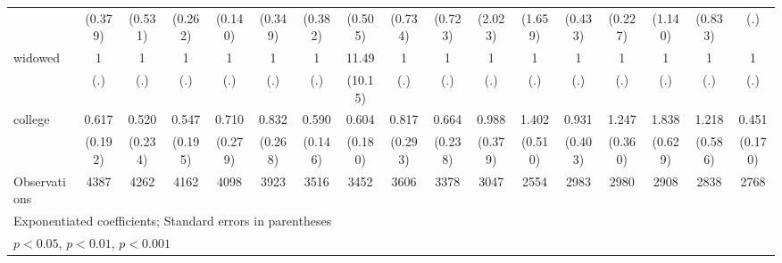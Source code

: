 {\begin{tabular}{l*{16}{c}}
                    &     (0.379)         &     (0.531)         &     (0.262)         &     (0.140)         &     (0.349)         &     (0.382)         &     (0.505)         &     (0.734)         &     (0.723)         &     (2.023)         &     (1.659)         &     (0.433)         &     (0.227)         &     (1.140)         &     (0.833)         &         (.)         \\
[1em]
widowed             &           1         &           1         &           1         &           1         &           1         &           1         &       11.49\sym{**} &           1         &           1         &           1         &           1         &           1         &           1         &           1         &           1         &           1         \\
                    &         (.)         &         (.)         &         (.)         &         (.)         &         (.)         &         (.)         &     (10.15)         &         (.)         &         (.)         &         (.)         &         (.)         &         (.)         &         (.)         &         (.)         &         (.)         &         (.)         \\
[1em]
college             &       0.617         &       0.520         &       0.547         &       0.710         &       0.832         &       0.590\sym{*}  &       0.604         &       0.817         &       0.664         &       0.988         &       1.402         &       0.931         &       1.247         &       1.838         &       1.218         &       0.451\sym{*}  \\
                    &     (0.192)         &     (0.234)         &     (0.195)         &     (0.279)         &     (0.268)         &     (0.146)         &     (0.180)         &     (0.293)         &     (0.238)         &     (0.379)         &     (0.510)         &     (0.403)         &     (0.360)         &     (0.629)         &     (0.586)         &     (0.170)         \\
\hline
Observations        &        4387         &        4262         &        4162         &        4098         &        3923         &        3516         &        3452         &        3606         &        3378         &        3047         &        2554         &        2983         &        2980         &        2908         &        2838         &        2768         \\
\hline\hline
\multicolumn{17}{l}{\footnotesize Exponentiated coefficients; Standard errors in parentheses}\\
\multicolumn{17}{l}{\footnotesize \sym{*} \(p<0.05\), \sym{**} \(p<0.01\), \sym{***} \(p<0.001\)}\\
\end{tabular}
}
